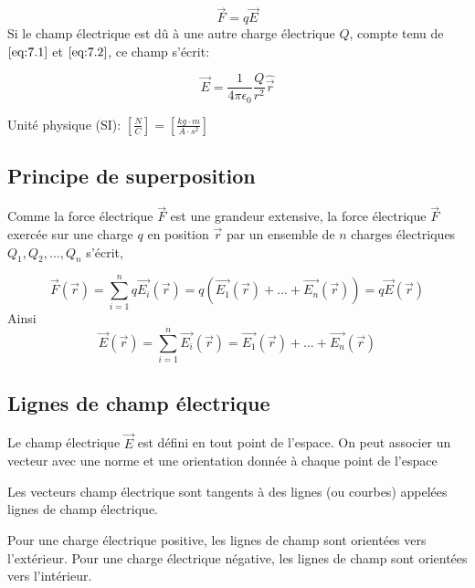 \documentclass[
    11pt,
    a4paper,
    oneside,
    headinlcude, footinclude,
    twoside,
]{report}
\renewcommand{\vec}[1]{\overrightarrow{#1}}
\begin{document}
\begin{equation}
    \label{eq:7.2}
    \vec F = q \vec E
\end{equation}
Si le champ électrique est d\^u à une autre charge électrique $Q$, compte tenu
de $\eqref{eq:7.1}$ et $\eqref{eq:7.2}$, ce champ s'écrit:

\begin{equation}
    \label{eq:7.3}
    \vec E  = \frac{1}{4 \pi \epsilon_0} \frac{Q}{r^2} \widehat{\vec r}
\end{equation}

Unité physique (SI): $\left[\frac{N}{C}\right] = \left[\frac{kg \cdot m}{A \cdot
s^2}\right]$

\subsection{Principe de superposition}
\label{sub:principe_de_superposition}

Comme la force électrique $\vec F$ est une grandeur extensive, la force
électrique $\vec F$ exercée sur une charge $q$ en position $\vec r$ par un
ensemble de $n$ charges électriques $Q_1, Q_2, ..., Q_n$ s'écrit,

\begin{equation}
    \label{eq:7.4}
    \vec F(\vec r) = \sum_{i=1}^n q \vec{E_{i}} (\vec r) = q (\vec{E_{1}}(\vec r)
    + ... + \vec{E_{n}}(\vec r)) = q \vec E(\vec r)
\end{equation}
Ainsi
\begin{equation}
    \label{eq:7.5}
    \vec E(\vec r) = \sum_{i=1}^n \vec{E_{i}}(\vec r) = \vec{E_{1}}(\vec r)
    + ... + \vec{E_{n}}(\vec r)
\end{equation}

\subsection{Lignes de champ électrique}
\label{sub:lignes_de_champ_electrique}

Le champ électrique $\vec E$ est défini en tout point de l'espace. On peut
associer un vecteur avec une norme et une orientation donnée à chaque point de
l'espace



Les vecteurs champ électrique sont tangents à des lignes (ou courbes) appelées
lignes de champ électrique.


Pour une charge électrique positive, les lignes de champ sont orientées vers
l'extérieur.
Pour une charge électrique négative, les lignes de champ sont orientées vers
l'intérieur.
\end{document}

